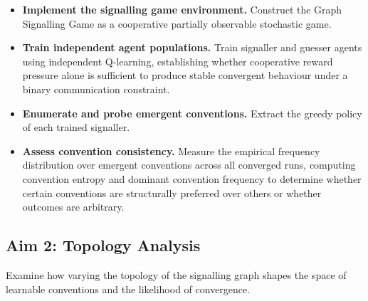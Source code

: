\documentclass[a4paper,twoside,12pt]{report}
\begin{document}
    \begin{itemize}
        \item[\textbf{O1.1}] \textbf{Implement the signalling game environment.}
        Construct the Graph Signalling Game as a cooperative partially observable
        stochastic game.
    
        \item[\textbf{O1.2}] \textbf{Train independent agent populations.}
        Train signaller and guesser agents using independent Q-learning, establishing whether cooperative reward pressure alone is sufficient to produce stable convergent behaviour under a binary communication constraint.
    
        \item[\textbf{O1.3}] \textbf{Enumerate and probe emergent conventions.}
        Extract the greedy policy of each trained signaller.
    
        \item[\textbf{O1.4}] \textbf{Assess convention consistency.}
        Measure the empirical frequency distribution over emergent conventions
        across all converged runs, computing convention entropy and dominant
        convention frequency to determine whether certain conventions are
        structurally preferred over others or whether outcomes are arbitrary.
    
    \end{itemize}
    
    \subsection*{Aim 2: Topology Analysis}
    
    Examine how varying the topology of the signalling graph shapes the space of learnable
    conventions and the likelihood of convergence.
    
\end{document}
